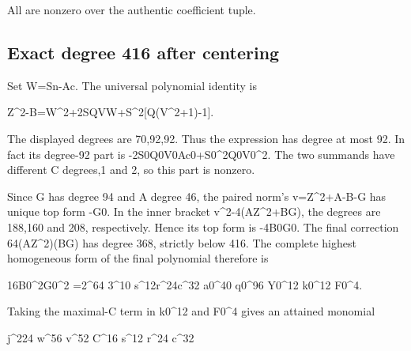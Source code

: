 All are nonzero over the authentic coefficient tuple.



\subsection*{Exact degree 416 after centering}



Set W=\allowbreak{}Sn-Ac. The universal polynomial identity is



Z\textasciicircum{}\allowbreak{}2-B=\allowbreak{}W\textasciicircum{}\allowbreak{}2+\allowbreak{}2SQVW+\allowbreak{}S\textasciicircum{}\allowbreak{}2[Q(V\textasciicircum{}\allowbreak{}2+\allowbreak{}1)-1].



The displayed degrees are 70,92,92. Thus the expression has degree at most 92. In fact its degree-92 part is -2S0Q0V0Ac0+\allowbreak{}S0\textasciicircum{}\allowbreak{}2Q0V0\textasciicircum{}\allowbreak{}2. The two summands have different C degrees,1 and 2, so this part is nonzero.



Since G has degree 94 and A degree 46, the paired norm's v=\allowbreak{}Z\textasciicircum{}\allowbreak{}2+\allowbreak{}A-B-G has unique top form -G0. In the inner bracket v\textasciicircum{}\allowbreak{}2-4(AZ\textasciicircum{}\allowbreak{}2+\allowbreak{}BG), the degrees are 188,160 and 208, respectively. Hence its top form is -4B0G0. The final correction 64(AZ\textasciicircum{}\allowbreak{}2)(BG) has degree 368, strictly below 416. The complete highest homogeneous form of the final polynomial therefore is



16B0\textasciicircum{}\allowbreak{}2G0\textasciicircum{}\allowbreak{}2 =\allowbreak{}2\textasciicircum{}\allowbreak{}64 3\textasciicircum{}\allowbreak{}10 s\textasciicircum{}\allowbreak{}12r\textasciicircum{}\allowbreak{}24c\textasciicircum{}\allowbreak{}32 a0\textasciicircum{}\allowbreak{}40 q0\textasciicircum{}\allowbreak{}96 Y0\textasciicircum{}\allowbreak{}12 k0\textasciicircum{}\allowbreak{}12 F0\textasciicircum{}\allowbreak{}4.



Taking the maximal-C term in k0\textasciicircum{}\allowbreak{}12 and F0\textasciicircum{}\allowbreak{}4 gives an attained monomial



j\textasciicircum{}\allowbreak{}224 w\textasciicircum{}\allowbreak{}56 v\textasciicircum{}\allowbreak{}52 C\textasciicircum{}\allowbreak{}16 s\textasciicircum{}\allowbreak{}12 r\textasciicircum{}\allowbreak{}24 c\textasciicircum{}\allowbreak{}32



